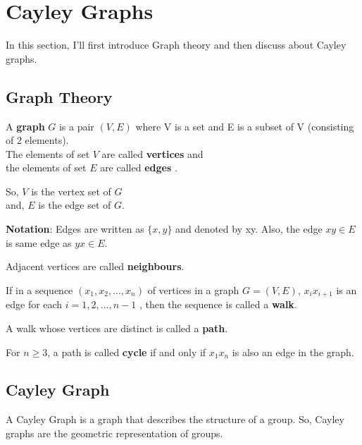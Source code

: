 \section{Cayley Graphs}\label{cayley}

In this section, I'll first introduce Graph theory and then discuss about Cayley graphs. 


\subsection*{Graph Theory}
\begin{definition}
    A \textbf{graph} $G$ is a pair $(V, E)$ where V is a set and E is a subset of V (consisting of 2 elements).\\
The elements of set $V$ are called \textbf{vertices} and\\ the elements of set $E$ are called \textbf{edges} \cite{Tripi2017CayleyGO}.    
\end{definition}

So,  $V$ is the vertex set of $G$\\
and, $E$ is the edge set of $G$. 

\textbf{Notation}: Edges are written as $\{x, y\}$ and denoted by xy. Also, the edge $xy \in E$ is same edge as $yx \in E$. 
\begin{note} Adjacent vertices are called \textbf{neighbours}.   \end{note}
\begin{definition}
    If in a sequence $\left(x_1, x_2, ..., x_n\right)$ of vertices in a graph $G = (V, E)$, $x_i x_{i+1}$ is an edge for each $i=1,2, ..., n-1$ , then the sequence is called a \textbf{walk}. 
\end{definition}

\begin{definition}
    A walk whose vertices are distinct is called a \textbf{path}.
\end{definition}

\begin{definition}
    For $n \geq 3$, a path is called \textbf{cycle} if and only if $x_1x_n$ is also an edge in the graph. 
\end{definition}


\subsection*{Cayley Graph}

A Cayley Graph \cite{bartlett2014cayley,article} is a graph that describes the structure of a group. So, Cayley graphs are the geometric representation of groups. 

